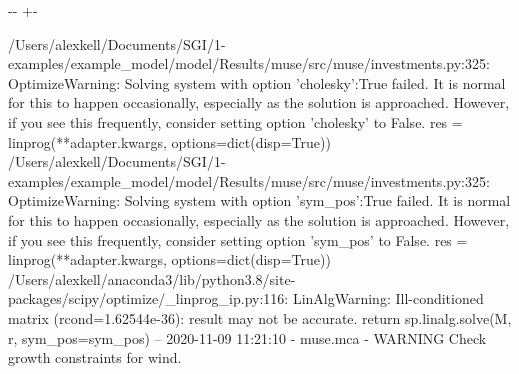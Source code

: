 \documentclass[letterpaper,10pt,english]{sphinxmanual}
\newlength\nbsphinxcodecellspacing
\begin{document}
{

\kern-\sphinxverbatimsmallskipamount\kern-\baselineskip
\kern+\FrameHeightAdjust\kern-\fboxrule
\vspace{\nbsphinxcodecellspacing}

\begin{sphinxVerbatim}[commandchars=\\\{\}]
/Users/alexkell/Documents/SGI/1-examples/example\_model/model/Results/muse/src/muse/investments.py:325: OptimizeWarning: Solving system with option 'cholesky':True failed. It is normal for this to happen occasionally, especially as the solution is approached. However, if you see this frequently, consider setting option 'cholesky' to False.
  res = linprog(**adapter.kwargs, options=dict(disp=True))
/Users/alexkell/Documents/SGI/1-examples/example\_model/model/Results/muse/src/muse/investments.py:325: OptimizeWarning: Solving system with option 'sym\_pos':True failed. It is normal for this to happen occasionally, especially as the solution is approached. However, if you see this frequently, consider setting option 'sym\_pos' to False.
  res = linprog(**adapter.kwargs, options=dict(disp=True))
/Users/alexkell/anaconda3/lib/python3.8/site-packages/scipy/optimize/\_linprog\_ip.py:116: LinAlgWarning: Ill-conditioned matrix (rcond=1.62544e-36): result may not be accurate.
  return sp.linalg.solve(M, r, sym\_pos=sym\_pos)
-- 2020-11-09 11:21:10 - muse.mca - WARNING
Check growth constraints for wind.

\end{sphinxVerbatim}
}
\end{document}
